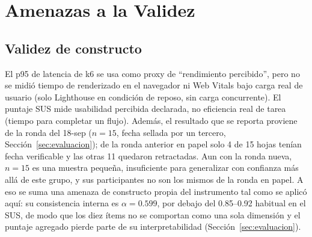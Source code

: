 \section{Amenazas a la Validez}
\label{sec:amenazas-validez}

\subsection{Validez de constructo}
El p95 de latencia de k6 se usa como proxy de ``rendimiento percibido'', pero no se midió tiempo de
renderizado en el navegador ni Web Vitals bajo carga real de usuario (solo Lighthouse en condición de
reposo, sin carga concurrente). El puntaje SUS mide usabilidad percibida declarada, no eficiencia real de
tarea (tiempo para completar un flujo). Además, el resultado que se reporta proviene de la ronda del
18-sep ($n=15$, fecha sellada por un tercero, Sección~\ref{sec:evaluacion}); de la ronda anterior en
papel solo 4 de 15 hojas tenían fecha verificable y las otras 11 quedaron retractadas. Aun con la ronda
nueva, $n=15$ es una muestra pequeña, insuficiente para generalizar con confianza más allá de este
grupo, y sus participantes no son los mismos de la ronda en papel. A eso se suma una amenaza de
constructo propia del instrumento tal como se aplicó aquí: su consistencia interna es
$\alpha = 0.599$, por debajo del 0.85--0.92 habitual en el SUS, de modo que los diez ítems no se
comportan como una sola dimensión y el puntaje agregado pierde parte de su interpretabilidad
(Sección~\ref{sec:evaluacion}).

